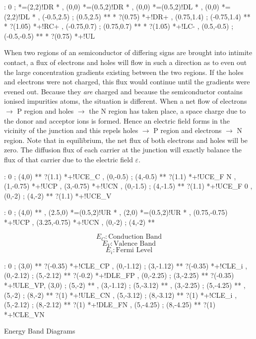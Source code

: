\documentclass[a4paper,12pt]{article}
\begin{document}
\begin{table}[hbtp]

\xy <1cm,0cm>:
0 ; *=(2,2)!DR *\frm{-} ,
(0,0) *=(0.5,2)!DR\txt{-} *\frm{-} ,
(0,0) *=(0.5,2)!DL\txt{+} *\frm{-} ,
(0,0) *=(2,2)!DL *\frm{-} ,
(-0.5,2.5) ; (0.5,2.5) **\dir{-} *\dir{>} ?(0.75) *+!DR{+} ,
(0.75,1.4) ; (-0.75,1.4) **\dir{-} *\dir{>} ?(1.05) *+!RC{+} ,
(-0.75,0.7) ; (0.75,0.7) **\dir{-} *\dir{>} ?(1.05) *+!LC{-} ,
(0.5,-0.5) ; (-0.5,-0.5) **\dir{-} *\dir{>} ?(0.75) *+!UL{\varepsilon} 
\endxy

\end{table}

When two regions of an semiconductor of differing signs are
brought into intimite contact, a flux of electrons and holes will flow
in such a direction as to even out the large concentration gradients
existing between the two regions. If the holes and electrons were not
charged, this flux would continue until the gradients were evened out.
Because they \emph{are} charged and because the semiconductor contains
ionised impurities atoms, the situation is different. When a net flow of
electrons $\to$ P region and holes $\to$ the N region has taken place, a
space charge due to the donor and acceptor ions is formed. Hence an
electric field forms in the vicinity of the junction and this repels
holes $\to$ P region and electrons $\to$ N region. Note that in
equilibrium, the net flux of both electrons and holes will be zero. The
diffusion flux of each carrier at the junction will exactly balance the
flux of that carrier due to the electric field $\varepsilon$.

\begin{table}[hbtp]

\xy <1cm,0cm>:
0 ; (4,0) **\dir{-} ?(1.1) *+!UC{E_{C}} ,
(0,-0.5) ; (4,-0.5) **\dir{-} ?(1.1) *+!UC{E_{F N}} ,
(1,-0.75) *+!UC{P} ,
(3,-0.75) *+!UC{N} ,
(0,-1.5) ; (4,-1.5) **\dir{-} ?(1.1) *+!UC{E_{F 0}} ,
(0,-2) ; (4,-2) **\dir{-} ?(1.1) *+!UC{E_{V}}
\endxy

\end{table}

\begin{table}[hbtp]

\xy <1cm,0cm>:
0 ; (4,0) **\dir{-} ,
(2.5,0) *=(0.5,2)!UR\txt{-} *\frm{-} ,
(2,0) *=(0.5,2)!UR\txt{+} *\frm{-} ,
(0.75,-0.75) *+!UC{P} ,
(3.25,-0.75) *+!UC{N} ,
(0,-2) ; (4,-2) **\dir{-}
\endxy

\[ E_{C}: \mbox{Conduction Band} \]
\[ E_{V}: \mbox{Valence Band} \]
\[ E_{i}: \mbox{Fermi Level} \]

\xy <1cm,0cm>:
0 ; (3,0) **\dir{-} ?(-0.35) *+!CL{E_{CP}} ,
(0,-1.12) ; (3,-1.12) **\dir{--} ?(-0.35) *+!CL{E_{i}} ,
(0,-2.12) ; (5,-2.12) **\dir{-} ?(-0.2) *+!DL{E_{FP}} ,
(0,-2.25) ; (3,-2.25) **\dir{-} ?(-0.35) *+!UL{E_{VP}},
%
(3,0) ; (5,-2) **\dir{-} ,
(3,-1.12) ; (5,-3.12) **\dir{--} ,
(3,-2.25) ; (5,-4.25) **\dir{-} ,
%
(5,-2) ; (8,-2) **\dir{-} ?(1) *+!UL{E_{CN}} ,
(5,-3.12) ; (8,-3.12) **\dir{--} ?(1) *+!CL{E_{i}} ,
(5,-2.12) ; (8,-2.12) **\dir{-} ?(1) *+!DL{E_{FN}} ,
(5,-4.25) ; (8,-4.25) **\dir{-} ?(1) *+!CL{E_{VN}}
\endxy

\caption{Energy Band Diagrams}

\end{table}
\end{document}
